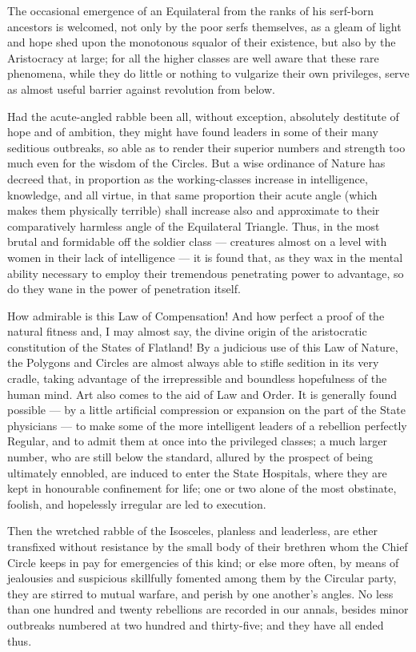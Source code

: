 \documentclass[12pt, a4paper, twoside]{memoir}
\begin{document}
The occasional emergence of an Equilateral from the ranks of his serf-born
ancestors is welcomed, not only by the poor serfs themselves, as a gleam of
light and hope shed upon the monotonous squalor of their existence, but also
by the Aristocracy at large; for all the higher classes are well aware that
these rare phenomena, while they do little or nothing to vulgarize their own
privileges, serve as almost useful barrier against revolution from below.

Had the acute-angled rabble been all, without exception, absolutely destitute
of hope and of ambition, they might have found leaders in some of their many
seditious outbreaks, so able as to render their superior numbers and strength
too much even for the wisdom of the Circles. But a wise ordinance of Nature
has decreed that, in proportion as the working-classes increase in
intelligence, knowledge, and all virtue, in that same proportion their acute
angle (which makes them physically terrible) shall increase also and
approximate to their comparatively harmless angle of the Equilateral Triangle.
Thus, in the most brutal and formidable off the soldier class --- creatures
almost on a level with women in their lack of intelligence --- it is found that,
as they wax in the mental ability necessary to employ their tremendous
penetrating power to advantage, so do they wane in the power of penetration
itself.

How admirable is this Law of Compensation! And how perfect a proof of the
natural fitness and, I may almost say, the divine origin of the aristocratic
constitution of the States of Flatland! By a judicious use of this Law of
Nature, the Polygons and Circles are almost always able to stifle sedition in
its very cradle, taking advantage of the irrepressible and boundless
hopefulness of the human mind. Art also comes to the aid of Law and Order. It
is generally found possible --- by a little artificial compression or expansion
on the part of the State physicians --- to make some of the more intelligent
leaders of a rebellion perfectly Regular, and to admit them at once into the
privileged classes; a much larger number, who are still below the standard,
allured by the prospect of being ultimately ennobled, are induced to enter the
State Hospitals, where they are kept in honourable confinement for life; one
or two alone of the most obstinate, foolish, and hopelessly irregular are led
to execution.

Then the wretched rabble of the Isosceles, planless and leaderless, are ether
transfixed without resistance by the small body of their brethren whom the
Chief Circle keeps in pay for emergencies of this kind; or else more often, by
means of jealousies and suspicious skillfully fomented among them by the
Circular party, they are stirred to mutual warfare, and perish by one
another's angles. No less than one hundred and twenty rebellions are recorded
in our annals, besides minor outbreaks numbered at two hundred and
thirty-five; and they have all ended thus.
\end{document}
